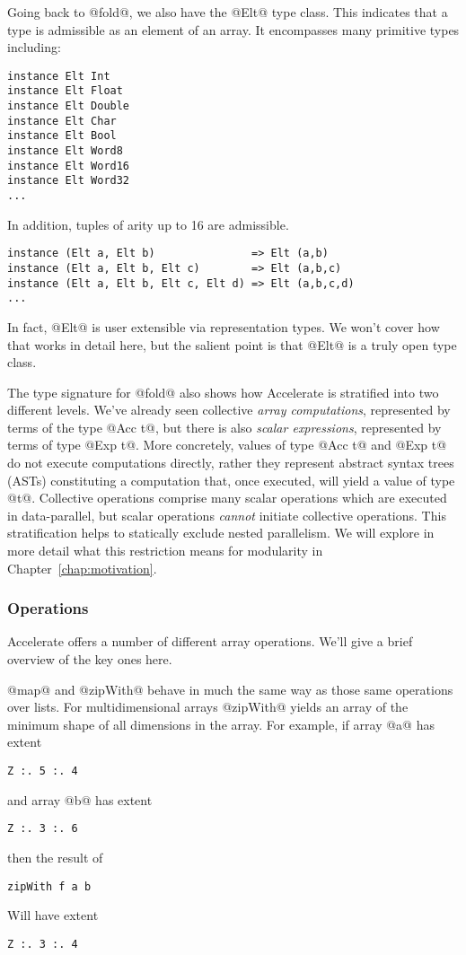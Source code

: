 Going back to @fold@, we also have the @Elt@ type class. This indicates that a type is admissible as an element of an array. It encompasses many primitive types including:
%
\begin{lstlisting}
instance Elt Int
instance Elt Float
instance Elt Double
instance Elt Char
instance Elt Bool
instance Elt Word8
instance Elt Word16
instance Elt Word32
...
\end{lstlisting}
%
In addition, tuples of arity up to 16 are admissible.
%
\begin{lstlisting}
instance (Elt a, Elt b)               => Elt (a,b)
instance (Elt a, Elt b, Elt c)        => Elt (a,b,c)
instance (Elt a, Elt b, Elt c, Elt d) => Elt (a,b,c,d)
...
\end{lstlisting}
%
In fact, @Elt@ is user extensible via representation types. We won't cover how that works in detail here, but the salient point is that @Elt@ is a truly open type class.

The type signature for @fold@ also shows how Accelerate is stratified into two different levels. We've already seen collective \emph{array computations}, represented by terms of the type @Acc t@, but there is also \emph{scalar expressions}, represented by terms of type @Exp t@. More concretely, values of type @Acc t@ and @Exp t@ do not execute computations directly, rather they represent abstract syntax trees (ASTs) constituting a computation that, once executed, will yield a value of type @t@. Collective operations comprise many scalar operations which are executed in data-parallel, but scalar operations \emph{cannot} initiate collective operations. This stratification helps to statically exclude nested parallelism. We will explore in more detail what this restriction means for modularity in Chapter~\ref{chap:motivation}.

\subsubsection{Operations}

Accelerate offers a number of different array operations. We'll give a brief overview of the key ones here.

@map@ and @zipWith@ behave in much the same way as those same operations over lists. For multidimensional arrays @zipWith@ yields an array of the minimum shape of all dimensions in the array. For example, if array @a@ has extent
%
\begin{lstlisting}
Z :. 5 :. 4
\end{lstlisting}
%
and array @b@ has extent
%
\begin{lstlisting}
Z :. 3 :. 6
\end{lstlisting}
%
then the result of
%
\begin{lstlisting}
zipWith f a b
\end{lstlisting}
%
Will have extent
%
\begin{lstlisting}
Z :. 3 :. 4
\end{lstlisting}
%


